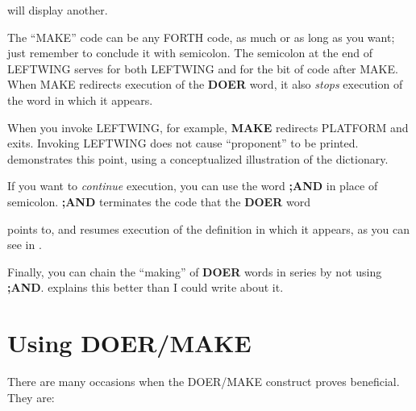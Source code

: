 will display another.

The ``MAKE'' code can be any FORTH code, as much or as long as
you want; just remember to conclude it with semicolon. The semicolon at
the end of LEFTWING serves for both LEFTWING and for the bit of
code after MAKE. When MAKE redirects execution of the \textbf{DOER} word,
it also \emph{stops} execution of the word in which it appears.

When you invoke LEFTWING, for example, \textbf{MAKE} redirects
PLATFORM and exits. Invoking LEFTWING does not cause ``proponent''
to be printed.  demonstrates this point, using a
conceptualized illustration of the dictionary.

If you want to \emph{continue} execution, you can use the word \textbf{;AND} in
place of semicolon. \textbf{;AND} terminates the code that the \textbf{DOER} word



points to, and resumes execution of the definition in which it appears, as
you can see in .

Finally, you can chain the ``making'' of \textbf{DOER} words in series by
not using \textbf{;AND}.  explains this better than I could write about
it.

\section{Using DOER/MAKE}

There are many occasions when the DOER/MAKE construct proves
beneficial. They are:

